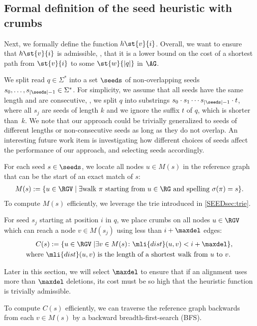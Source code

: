 \subsection{Formal definition of the seed heuristic with crumbs} \label{SEEDsec:definition}
%
Next, we formally define the \seedh function $h\st{v}{i}$. Overall, we want to
ensure that $h\st{v}{i}$ is admissible, \ie, that it is a lower bound on the
cost of a shortest path from $\st{v}{i}$ to some $\st{w}{|q|}$ in $\AG$.

%
We split read $q \in \Sigma^*$ into a set $\seeds$ of non-overlapping seeds
$s_0, \dots, s_{|\seeds|-1} \in \Sigma^*$.
%
For simplicity, we assume that all seeds have the same length and are
consecutive, \ie, we split $q$ into substrings $s_0 \cdot s_1 \cdots
s_{|\seeds|-1} \cdot t$, where all $s_j$ are seeds of length $k$ and we ignore
the suffix $t$ of $q$, which is shorter than~$k$.
%
We note that our approach could be trivially generalized to seeds of different
lengths or non-consecutive seeds as long as they do not overlap. An interesting
future work item is investigating how different choices of seeds affect the
performance of our approach, and selecting seeds accordingly.

%
For each seed $s \in \seeds$, we locate all nodes $u \in M(s)$ in the reference
graph that can be the start of an exact match of $s$:
%
\begin{align*}
	M(s) := \{u \in \RGV \mid \exists \text{walk } \pi \text{ starting from } u \in \RG \text{ and spelling } \sigma(\pi) = s \}.
\end{align*}
%
To compute $M(s)$ efficiently, we leverage the trie introduced in
\cref{SEEDsec:trie}.

For seed $s_j$ starting at position $i$ in $q$, we place crumbs on all nodes $u
\in \RGV$ which can reach a node $v \in M(s_j)$ using less than $i+\maxdel$
edges:
%
\begin{align*}
	C(s) := \{u \in \RGV \mid & \exists v \in M(s)\colon \mli{dist}(u, v) < i + \maxdel \},\\
	\text{where }\mli{dist}(u, v) &\text{ is the length of a shortest walk from } u \text{ to } v.
\end{align*}

Later in this section, we will select $\maxdel$ to ensure that if an alignment
uses more than $\maxdel$ deletions, its cost must be so high that the heuristic
function is trivially admissible.

To compute $C(s)$ efficiently, we can traverse the reference graph backwards
from each $v \in M(s)$ by a backward breadth-first-search (BFS).

